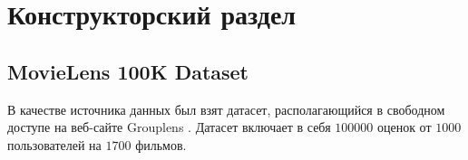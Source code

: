 \section{Конструкторский раздел}

\subsection{MovieLens 100K Dataset}

В качестве источника данных был взят датасет, располагающийся в свободном доступе на веб-сайте Grouplens \cite{dataset}. Датасет включает в себя $100 000$ оценок от $1000$ пользователей на $1700$ фильмов.

\pagebreak
